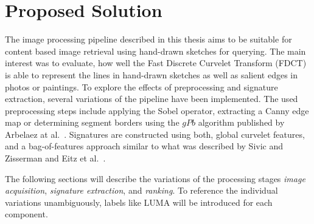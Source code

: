 \chapter{Proposed Solution}\label{ch:solution}

The image processing pipeline described in this thesis aims to be suitable for
content based image retrieval using hand-drawn sketches for querying. The main
interest was to evaluate, how well the Fast Discrete Curvelet Transform (FDCT)
\autocite{candes_fast_2006} is able to represent the lines in hand-drawn
sketches as well as salient edges in photos or paintings. To explore the
effects of preprocessing and signature extraction, several variations of the
pipeline have been implemented. The used preprocessing steps include applying
the Sobel operator, extracting a Canny edge map or determining segment borders
using the $gPb$ algorithm published by Arbelaez at al.\
\autocite{arbelaez_contour_2011}.  Signatures are constructed using both,
global curvelet features, and a bag-of-features approach similar to what was
described by Sivic and Zisserman \autocite{sivic_video_2003} and Eitz et al.\
\autocite{eitz_sketch-based_2011}.

The following sections will describe the variations of the processing stages
\emph{image acquisition}, \emph{signature extraction}, and \emph{ranking}. To
reference the individual variations unambiguously, labels like LUMA will
be introduced for each component.







